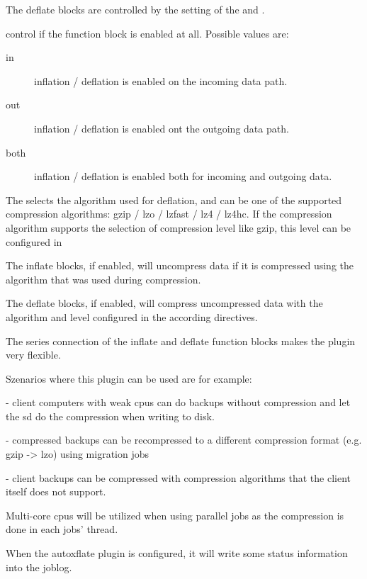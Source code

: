 The deflate blocks are controlled by the setting of the 
 and   .


  control if the
function block is enabled at all.
Possible values are:
\begin{description}
 \item [in] inflation / deflation is enabled on the incoming data path.
 \item [out] inflation / deflation is enabled ont the outgoing data path.
 \item [both] inflation / deflation is enabled both for incoming and outgoing data.
\end{description}

The  selects the algorithm used for deflation,
and can be one of the supported compression algorithms: gzip / lzo / lzfast / lz4 / lz4hc.
If the compression algorithm supports the selection of compression level like gzip, this level can be configured in 

The inflate blocks, if enabled, will uncompress data if it is compressed using the
algorithm that was used during compression.

The deflate blocks, if enabled, will compress uncompressed data with the algorithm and level configured in the according directives.

The series connection of the inflate and deflate function blocks makes the plugin very flexible.

Szenarios where this plugin can be used are for example:

- client computers with weak cpus can do backups without compression and
  let the sd do the compression when writing to disk.

- compressed backups can be recompressed to a different compression format (e.g. gzip -> lzo) using migration jobs

- client backups can be compressed with compression algorithms that the client itself does not support.

Multi-core cpus will be utilized when using parallel jobs as the compression is done in each jobs' thread.

When the autoxflate plugin is configured, it will write some status information into the joblog.

